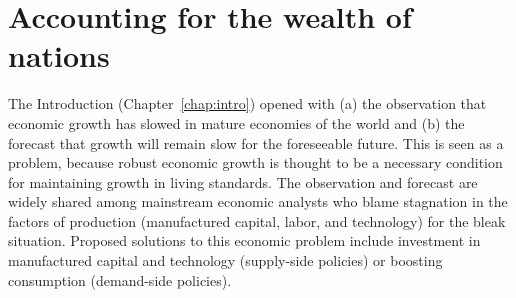%
%
%


\chapter{Accounting for the wealth of nations}
\label{chap:acct_for_won}






The Introduction (Chapter~\ref{chap:intro}) opened with
(a) the observation that economic growth has slowed
in mature economies of the world and
(b) the forecast that growth will remain slow for the foreseeable future. 
This is seen as a problem, 
because robust economic growth is thought to be a necessary condition
for maintaining growth in living standards.
The observation and forecast are widely shared among mainstream economic analysts 
who blame stagnation in the factors of production 
(manufactured capital, labor, and technology) for the bleak situation. 
Proposed solutions to this economic problem include
investment in manufactured capital and technology (supply-side policies) 
or boosting consumption (demand-side policies).

